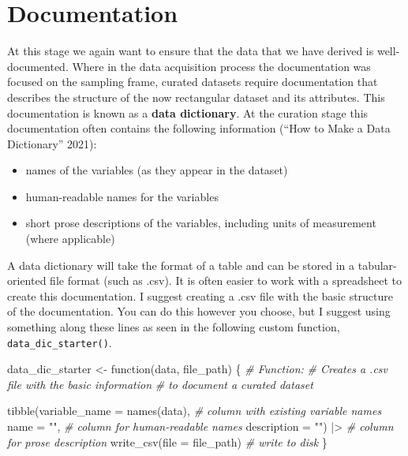 \documentclass[
  letterpaper,
]{latex/krantz}
\newenvironment{Shaded}{\begin{snugshade}}{\end{snugshade}}
\newcommand{\AttributeTok}[1]{\textcolor[rgb]{0.00,0.00,0.00}{#1}}
\newcommand{\CommentTok}[1]{\textcolor[rgb]{0.00,0.00,0.00}{\textit{#1}}}
\newcommand{\ControlFlowTok}[1]{\textcolor[rgb]{0.00,0.00,0.00}{#1}}
\newcommand{\FunctionTok}[1]{\textcolor[rgb]{0.00,0.00,0.00}{#1}}
\newcommand{\NormalTok}[1]{\textcolor[rgb]{0.00,0.00,0.00}{#1}}
\newcommand{\OtherTok}[1]{\textcolor[rgb]{0.00,0.00,0.00}{#1}}
\newcommand{\SpecialCharTok}[1]{\textcolor[rgb]{0.00,0.00,0.00}{#1}}
\newcommand{\StringTok}[1]{\textcolor[rgb]{0.00,0.00,0.00}{#1}}
\providecommand{\tightlist}{%
  \setlength{\itemsep}{0pt}\setlength{\parskip}{0pt}}\usepackage{longtable,booktabs,array}
\begin{document}
\hypertarget{documentation-2}{%
\section{Documentation}\label{documentation-2}}

At this stage we again want to ensure that the data that we have derived
is well-documented. Where in the data acquisition process the
documentation was focused on the sampling frame, curated datasets
require documentation that describes the structure of the now
rectangular dataset and its attributes. This documentation is known as a
\textbf{data dictionary}. At the curation stage this documentation often
contains the following information ({``How to Make a Data Dictionary''}
2021):

\begin{itemize}
\tightlist
\item
  names of the variables (as they appear in the dataset)
\item
  human-readable names for the variables
\item
  short prose descriptions of the variables, including units of
  measurement (where applicable)
\end{itemize}

A data dictionary will take the format of a table and can be stored in a
tabular-oriented file format (such as .csv). It is often easier to work
with a spreadsheet to create this documentation. I suggest creating a
.csv file with the basic structure of the documentation. You can do this
however you choose, but I suggest using something along these lines as
seen in the following custom function, \texttt{data\_dic\_starter()}.

\begin{Shaded}
\begin{Highlighting}[]
\NormalTok{data\_dic\_starter }\OtherTok{\textless{}{-}} \ControlFlowTok{function}\NormalTok{(data, file\_path) \{}
  \CommentTok{\# Function:}
  \CommentTok{\# Creates a .csv file with the basic information}
  \CommentTok{\# to document a curated dataset}
  
  \FunctionTok{tibble}\NormalTok{(}\AttributeTok{variable\_name =} \FunctionTok{names}\NormalTok{(data), }\CommentTok{\# column with existing variable names }
       \AttributeTok{name =} \StringTok{""}\NormalTok{, }\CommentTok{\# column for human{-}readable names}
       \AttributeTok{description =} \StringTok{""}\NormalTok{) }\SpecialCharTok{|\textgreater{}} \CommentTok{\# column for prose description}
  \FunctionTok{write\_csv}\NormalTok{(}\AttributeTok{file =}\NormalTok{ file\_path) }\CommentTok{\# write to disk}
\NormalTok{\}}
\end{Highlighting}
\end{Shaded}
\end{document}
